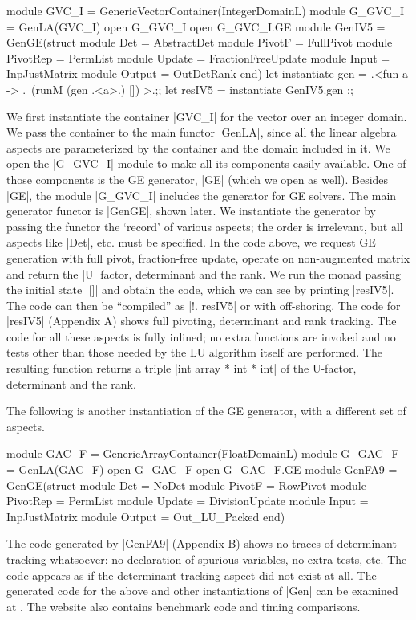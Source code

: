 \documentclass[draft]{elsart}
\begin{document}
\begin{code}
module GVC_I = GenericVectorContainer(IntegerDomainL)
module G_GVC_I = GenLA(GVC_I)
open G_GVC_I
open G_GVC_I.GE
module GenIV5 = GenGE(struct 
    module Det = AbstractDet
    module PivotF = FullPivot
    module PivotRep = PermList
    module Update = FractionFreeUpdate
    module Input = InpJustMatrix
    module Output = OutDetRank end)
let instantiate gen =
    .<fun a -> .~(runM (gen .<a>.) []) >.;;
let resIV5 = instantiate GenIV5.gen ;;
\end{code}
%
We first instantiate the container |GVC_I| for the vector over an
integer domain. We pass the container to the main functor |GenLA|,
since all the linear algebra aspects are parameterized by the
container and the domain included in it. We open the |G_GVC_I| module
to make all its components easily available. One of those components
is the GE generator, |GE| (which we open as well). Besides |GE|, the
module |G_GVC_I| includes the generator for GE solvers.  The main
generator functor is |GenGE|, shown later.  We instantiate the
generator by passing the functor the `record' of various aspects; the
order is irrelevant, but all aspects like |Det|, etc. must be
specified. In the code above, we request GE generation with full
pivot, fraction-free update, operate on non-augmented matrix and
return the |U| factor, determinant and the rank. We run the monad
passing the initial state |[]| and obtain the code, which we can see
by printing |resIV5|. The code can then be ``compiled'' as |!. resIV5|
or with off-shoring. The code for |resIV5| (Appendix A) shows full
pivoting, determinant and rank tracking. The code for all these
aspects is fully inlined; no extra functions are invoked and no tests
other than those needed by the LU algorithm itself are performed. The
resulting function returns a triple |int array * int * int| of the
U-factor, determinant and the rank.

The following is another instantiation of the GE generator, with a
different set of aspects.
\begin{code}
module GAC_F = GenericArrayContainer(FloatDomainL)
module G_GAC_F = GenLA(GAC_F)
open G_GAC_F
open G_GAC_F.GE
module GenFA9 = GenGE(struct 
    module Det = NoDet
    module PivotF = RowPivot
    module PivotRep = PermList
    module Update = DivisionUpdate
    module Input = InpJustMatrix
    module Output = Out_LU_Packed end)
\end{code}
The code generated by |GenFA9| (Appendix B) shows no traces of
determinant tracking whatsoever: no declaration of spurious variables,
no extra tests, etc. The code appears as if the determinant tracking
aspect did not exist at all. The generated code for the above and
other instantiations of |Gen| can be examined at
\cite{metamonadsURL}. The website also contains benchmark code and
timing comparisons.
\end{document}
